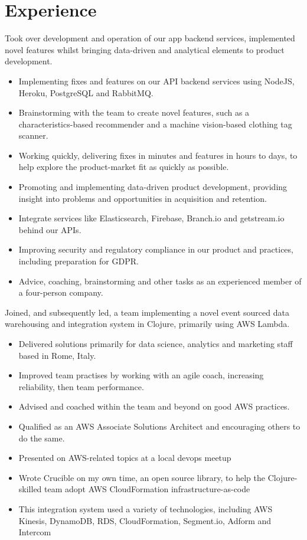 \documentclass[11pt,a4paper,sans]{moderncv}        %
\begin{document}
\section{Experience}
{Took over development and operation of our app backend services, implemented novel features whilst bringing data-driven and analytical elements to product development.
\newline{}
\begin{itemize}
\item Implementing fixes and features on our API backend services using NodeJS, Heroku, PostgreSQL and RabbitMQ.
\item Brainstorming with the team to create novel features, such as a characteristics-based recommender and a machine vision-based clothing tag scanner.
\item Working quickly, delivering fixes in minutes and features in hours to days, to help explore the product-market fit as quickly as possible.
\item Promoting and implementing data-driven product development, providing insight into problems and opportunities in acquisition and retention.
\item Integrate services like Elasticsearch, Firebase, Branch.io and getstream.io behind our APIs.
\item Improving security and regulatory compliance in our product and practices, including preparation for GDPR.
\item Advice, coaching, brainstorming and other tasks as an experienced member of a four-person company.
\end{itemize}
}

{Joined, and subsequently led, a team implementing a novel event sourced data warehousing and integration system in Clojure, primarily using AWS Lambda.
\newline{}
\begin{itemize}
\item Delivered solutions primarily for data science, analytics and marketing staff based in Rome, Italy.
\item Improved team practises by working with an agile coach, increasing reliability, then team performance.
\item Advised and coached within the team and beyond on good AWS practices.
\item Qualified as an AWS Associate Solutions Architect and encouraging others to do the same.
\item Presented on AWS-related topics at a local devops meetup
\item Wrote Crucible on my own time, an open source library, to help the Clojure-skilled team adopt AWS CloudFormation infrastructure-as-code
\item This integration system used a variety of technologies, including AWS Kinesis, DynamoDB, RDS, CloudFormation, Segment.io, Adform and  Intercom
\end{itemize}
}
\end{document}
